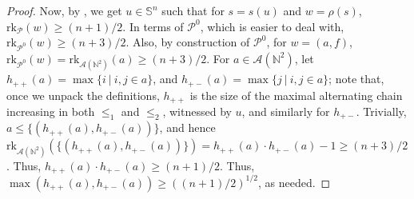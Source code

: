 \documentclass{article} %
\newcommand{\A}{\mathcal{A}}
\newcommand{\N}{\mathbb{N}}
\renewcommand{\SS}{\mathbb{S}}
\newcommand{\PP}{\mathcal{P}}
\newcommand{\rk}{\mathrm{rk}}
\begin{document}
\begin{proof}
	Now, by , we get $u\in \SS^n$ such that for $s = s(u)$ and $w=\rho(s)$, $\rk_{\PP}(w) \geq (n+1)/2$. In terms of $\PP^0$, which is easier to deal with, $\rk_{\PP^0}(w) \geq (n+3)/2$. Also, by construction of $\PP^0$, for $w = (a, f)$, $\rk_{\PP^0}(w) = \rk_{\A(\N^2)}(a) \geq (n+3)/2$. For $a\in \A(\N^2)$, let $h_{++}(a) = \max \{i~|~i,j\in a\}$, and $h_{+-}(a) = \max \{j~|~i,j\in a\}$; note that, once we unpack the definitions, $h_{++}$ is the size of the maximal alternating chain increasing in both $\leq_1$ and $\leq_2$, witnessed by $u$, and similarly for $h_{+-}$. Trivially, $a\leq \{(h_{++}(a), h_{+-}(a))\}$, and hence $\rk_{\A(\N^2)}\left(\{(h_{++}(a), h_{+-}(a))\}\right) = h_{++}(a) \cdot h_{+-}(a) - 1 \geq (n+3)/2$. Thus, $h_{++}(a) \cdot h_{+-}(a) \geq (n+1)/2$. Thus, $\max(h_{++}(a), h_{+-}(a)) \geq \left((n+1)/2\right)^{1/2}$, as needed.
\end{proof}
\end{document}
